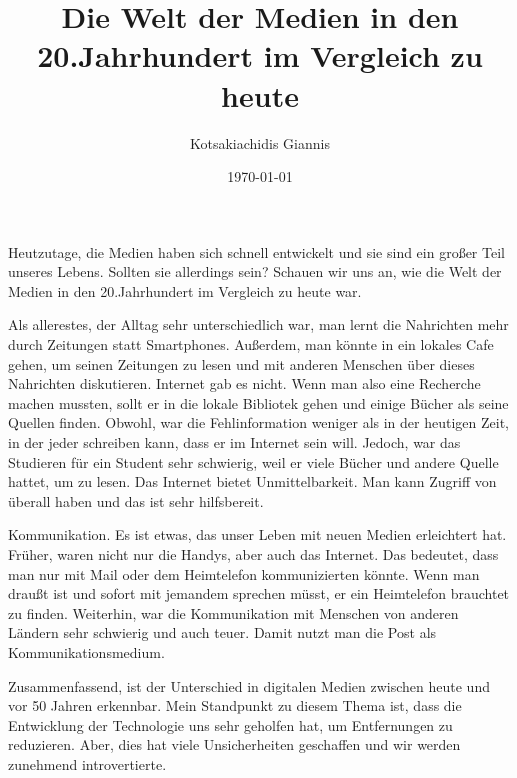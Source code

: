 \documentclass{article}
\title{Die Welt der Medien in den 20.Jahrhundert im Vergleich zu heute}
\author{Kotsakiachidis Giannis }
\date{\today }
\begin{document}
	\maketitle
	

	\renewcommand{\baselinestretch}{1.5} 
	
	\large Heutzutage, die Medien haben sich schnell entwickelt und sie sind ein großer Teil unseres Lebens. Sollten sie allerdings sein?
	Schauen wir uns an, wie die Welt der Medien in den 20.Jahrhundert im Vergleich zu heute war.
	
	Als allerestes, der Alltag sehr unterschiedlich war, man lernt die Nahrichten mehr durch Zeitungen statt Smartphones. Außerdem, man könnte in ein lokales Cafe gehen, um seinen Zeitungen zu lesen und mit anderen Menschen über dieses Nahrichten diskutieren. Internet gab es nicht. Wenn man also eine Recherche machen mussten, sollt er in die lokale Bibliotek gehen und einige Bücher als seine Quellen finden. Obwohl, war die Fehlinformation weniger als in der heutigen Zeit, in der jeder schreiben kann, dass er im Internet sein will. Jedoch, war das Studieren für ein Student sehr schwierig, weil er viele Bücher und andere Quelle hattet, um zu lesen. Das Internet bietet Unmittelbarkeit. Man kann Zugriff von überall haben und das ist sehr hilfsbereit.
	
	Kommunikation. Es ist etwas, das unser Leben mit neuen Medien erleichtert hat. Früher, waren nicht nur die Handys, aber auch das Internet. Das bedeutet, dass man nur mit Mail oder dem Heimtelefon kommunizierten könnte. Wenn man draußt ist und sofort mit jemandem sprechen müsst, er ein Heimtelefon brauchtet zu finden. Weiterhin, war die Kommunikation mit Menschen von anderen Ländern sehr schwierig und auch teuer. Damit nutzt man die Post als Kommunikationsmedium.
	
	Zusammenfassend, ist der Unterschied in digitalen Medien zwischen heute und vor 50 Jahren erkennbar. Mein Standpunkt zu diesem Thema ist, dass die Entwicklung der Technologie uns sehr geholfen hat, um Entfernungen zu reduzieren. Aber, dies hat viele Unsicherheiten geschaffen und wir werden zunehmend introvertierte.
	

	


	
\end{document}

